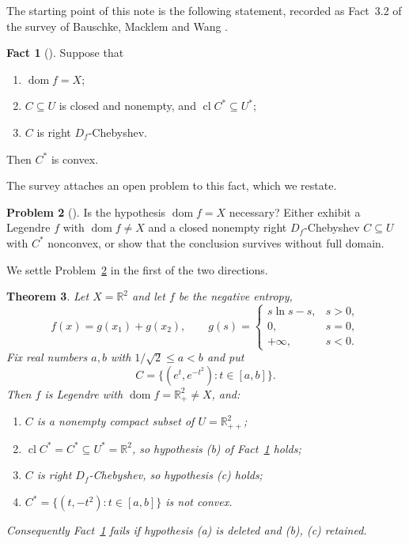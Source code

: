 \documentclass[11pt]{amsart}
\theoremstyle{plain}
\newtheorem{theorem}{Theorem}[section]
\theoremstyle{definition}
\newtheorem{fact}[theorem]{Fact}
\newtheorem{problem}[theorem]{Problem}
\theoremstyle{remark}
\newcommand{\R}{\mathbb{R}}
\newcommand{\dom}{\operatorname{dom}}
\newcommand{\cl}{\operatorname{cl}}
\newcommand{\D}{D_f}
\newcommand{\Cstar}{C^{*}}
\begin{document}
The starting point of this note is the following statement, recorded as
Fact~3.2 of the survey of Bauschke, Macklem and Wang \cite{BMW2010}.

\begin{fact}[{\cite[Fact 3.2]{BMW2010}}]\label{fact:BMW}
Suppose that
\begin{enumerate}[label=\textup{(\alph*)},leftmargin=2.2em]
  \item $\dom f = X$;
  \item $C \subseteq U$ is closed and nonempty, and $\cl \Cstar \subseteq U^{*}$;
  \item $C$ is right $\D$-Chebyshev.
\end{enumerate}
Then $\Cstar$ is convex.
\end{fact}

The survey attaches an open problem to this fact, which we restate.

\begin{problem}[{\cite[Problem 2]{BMW2010}}]\label{prob:2}
Is the hypothesis $\dom f = X$ necessary? Either exhibit a Legendre $f$ with
$\dom f \neq X$ and a closed nonempty right $\D$-Chebyshev $C \subseteq U$ with
$\Cstar$ nonconvex, or show that the conclusion survives without full domain.
\end{problem}

We settle Problem~\ref{prob:2} in the first of the two directions.

\begin{theorem}\label{thm:main}
Let $X = \R^{2}$ and let $f$ be the negative entropy,
\[
  f(x) = g(x_{1}) + g(x_{2}),
  \qquad
  g(s) =
  \begin{cases}
    s \ln s - s, & s > 0,\\
    0, & s = 0,\\
    +\infty, & s < 0.
  \end{cases}
\]
Fix real numbers $a, b$ with $1/\sqrt{2} \le a < b$ and put
\[
  C = \bigl\{ (e^{t}, e^{-t^{2}}) : t \in [a,b] \bigr\} .
\]
Then $f$ is Legendre with $\dom f = \R^{2}_{+} \neq X$, and:
\begin{enumerate}[label=\textup{(\roman*)},leftmargin=2.2em]
  \item $C$ is a nonempty compact subset of $U = \R^{2}_{++}$;
  \item $\cl \Cstar = \Cstar \subseteq U^{*} = \R^{2}$, so hypothesis \textup{(b)} of
        Fact~\textup{\ref{fact:BMW}} holds;
  \item $C$ is right $\D$-Chebyshev, so hypothesis \textup{(c)} holds;
  \item $\Cstar = \{ (t, -t^{2}) : t \in [a,b] \}$ is not convex.
\end{enumerate}
Consequently Fact~\textup{\ref{fact:BMW}} fails if hypothesis \textup{(a)} is
deleted and \textup{(b)}, \textup{(c)} retained.
\end{theorem}
\end{document}
